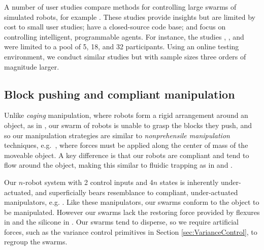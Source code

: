 A number of user studies compare methods for controlling large swarms of simulated robots, for example \cite{bashyal2008human,kolling2012towards,de2012controllability}.  These studies provide insights but are limited by cost to small user studies; have a closed-source code base; and focus on controlling intelligent, programmable agents.  
For instance, the studies \cite{bashyal2008human},  \cite{de2012controllability}, and \cite{kolling2012towards}  were limited to a pool of 5, 18, and 32  participants.
	Using an online testing environment, we conduct similar studies but with sample sizes three orders of magnitude larger.

\subsection{Block pushing and compliant manipulation}
Unlike \emph{caging} manipulation, where robots form a rigid arrangement around an object, as in \cite{Sudsang2002,Fink2007}, our swarm of robots is unable to grasp the blocks they push, and so our manipulation strategies are similar to \emph{nonprehensile manipulation} techniques, e.g.~\cite{Lynch1999}, where forces must be applied along the center of mass of the moveable object. A key difference is that our robots are compliant and tend to flow around the object, making this similar to fluidic trapping as in \cite{Armani2006} and \cite{Becker2009}.  

Our $n$-robot system with 2 control inputs and 4$n$ states is inherently under-actuated, and superficially bears resemblance to compliant, under-actuated manipulators, e.g. \cite{odhner2014compliant,deimel2014novel}.  Like these manipulators, our swarms conform to the object to be manipulated.  However our swarms lack the restoring force provided by flexures in \cite{odhner2014compliant} and the silicone in \cite{deimel2014novel}.  Our swarms tend to disperse, so we require  artificial forces, such as the variance control primitives in Section \ref{sec:VarianceControl},
 to regroup the swarms.
 

 


